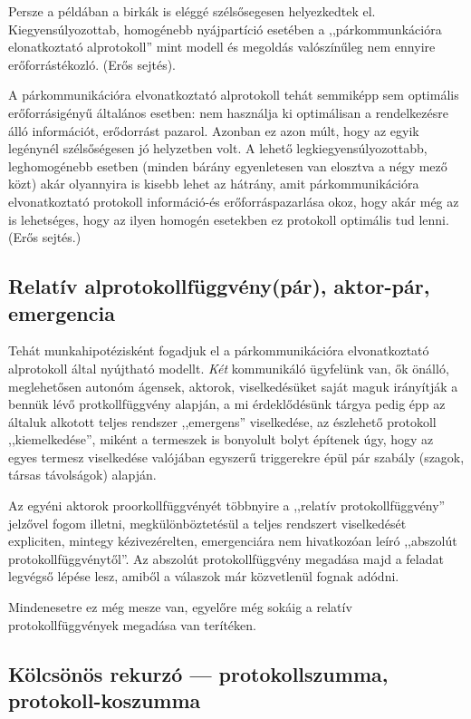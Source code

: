 \documentclass{article}
\begin{document}
	Persze a példában a birkák is eléggé szélsősegesen helyezkedtek el. Kiegyensúlyozottab, homogénebb nyájpartíció esetében a ,,párkommunkációra elonatkoztató alprotokoll'' mint modell és megoldás valószínűleg nem ennyire erőforrástékozló. (Erős sejtés).

	A párkommunikációra elvonatkoztató alprotokoll tehát semmiképp sem optimális erőforrásigényű általános esetben: nem használja ki optimálisan a rendelkezésre álló információt, erődorrást pazarol. Azonban ez azon múlt, hogy az egyik legénynél szélsőségesen jó helyzetben volt. A lehető legkiegyensúlyozottabb, leghomogénebb esetben (minden bárány egyenletesen van elosztva a négy mező közt) akár olyannyira is kisebb lehet az  hátrány, amit párkommunikációra elvonatkoztató protokoll információ-és erőforráspazarlása okoz, hogy akár még az is lehetséges, hogy az ilyen homogén esetekben ez  protokoll optimális tud lenni. (Erős sejtés.)

	\subsection{Relatív alprotokollfüggvény(pár), aktor-pár, emergencia}

	Tehát munkahipotézisként fogadjuk el a párkommunikációra elvonatkoztató alprotokoll által nyújtható modellt. \emph{Két} kommunikáló ügyfelünk van, ők önálló, meglehetősen autonóm ágensek, aktorok, viselkedésüket saját maguk irányítják a bennük lévő protkollfüggvény alapján, a mi érdeklődésünk tárgya pedig épp az általuk alkotott teljes rendszer ,,emergens'' viselkedése, az észlehető protokoll ,,kiemelkedése'', miként a termeszek is bonyolult bolyt építenek úgy, hogy az egyes termesz viselkedése valójában egyszerű triggerekre épül pár szabály (szagok, társas távolságok) alapján.

	Az egyéni aktorok proorkollfüggvényét többnyire a ,,relatív protokollfüggvény'' jelzővel fogom illetni, megkülönböztetésül a teljes rendszert viselkedését expliciten, mintegy kézivezérelten, emergenciára nem hivatkozóan leíró ,,abszolút protokollfüggvénytől''. Az abszolút protokollfüggvény megadása majd a feladat legvégső lépése lesz, amiből a válaszok már közvetlenül fognak adódni.

	Mindenesetre ez még mesze van, egyelőre még sokáig a relatív protokollfüggvények megadása van terítéken.

	\subsection{Kölcsönös rekurzó --- protokollszumma, protokoll-koszumma}
\end{document}
